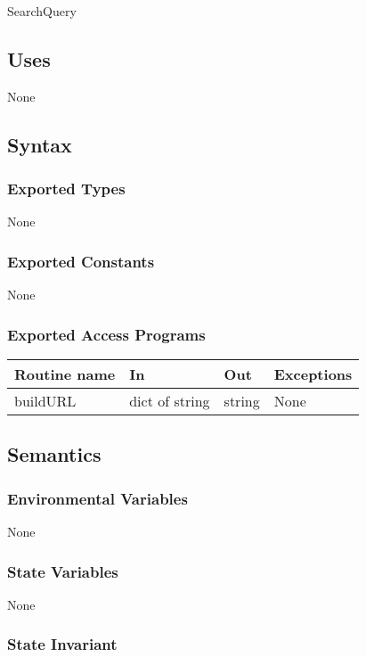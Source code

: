 \documentclass{article}
\begin{document}
SearchQuery

\subsection* {Uses}

None

\subsection* {Syntax}

\subsubsection* {Exported Types}

None

\subsubsection* {Exported Constants}

None

\subsubsection* {Exported Access Programs}

\begin{tabular}{| l | l | l | p{5cm} |}
\hline
\textbf{Routine name} & \textbf{In} & \textbf{Out} & \textbf{Exceptions}\\
\hline
buildURL & dict of string & string & None\\
\hline

\end{tabular}

\subsection* {Semantics}

\subsubsection* {Environmental Variables}

None

\subsubsection* {State Variables}

None

\subsubsection* {State Invariant}
\end{document}
